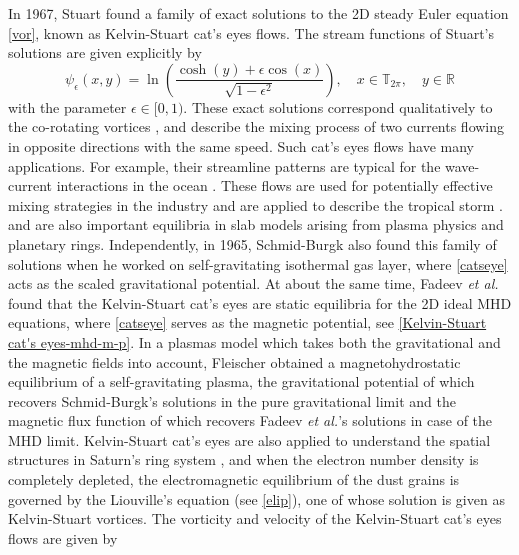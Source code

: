 \documentclass[1 [leqno, 11pt]{amsart}
\numberwithin{equation}{section}
\begin{document}
\begin{CJK*}{GBK}{song}
In 1967, Stuart \cite{stuart1967finite} found a family of exact solutions  to the 2D steady  Euler equation \eqref{vor}, known as Kelvin-Stuart cat's eyes flows. The stream functions of Stuart's solutions  are given explicitly by
\begin{equation}\label{catseye}
\psi_\epsilon(x,y) =  \ln \left(\frac{\cosh (y) + \epsilon \cos (x)}{\sqrt{1-\epsilon^2}} \right),\quad x\in\mathbb{T}_{2\pi},\quad y\in\mathbb{R}
\end{equation}
 with  the parameter $\epsilon \in [0, 1)$.
  These exact solutions correspond qualitatively to the co-rotating vortices \cite{Tabeling-Perrin-Fauve1987}, and
    describe the mixing process of two currents flowing in opposite directions with the same speed.
  Such cat's eyes flows have many applications. For example, their streamline patterns  are typical for the wave-current interactions in  the ocean \cite{Martin2018}.
  These flows are used for potentially effective mixing strategies in the industry \cite{Rossi-Doorly-Kustrin2013} and are applied to describe the tropical
storm \cite{Dunkerton-Montgomery-Wang2009}.
   and are also important equilibria in   slab models arising from plasma physics and  planetary rings.
  Independently, in 1965, Schmid-Burgk \cite{Schmid-Burgk1965} also found this family of solutions   when he worked on self-gravitating isothermal gas layer, where \eqref{catseye}  acts  as the scaled  gravitational potential.
  At about the same time,
 Fadeev  {\it et al.} \cite{Fadeev et al-1965} found that the Kelvin-Stuart cat's eyes are  static equilibria  for the 2D ideal MHD equations, where \eqref{catseye} serves as the  magnetic potential, see \eqref{Kelvin-Stuart cat's eyes-mhd-m-p}.
In a plasmas model which takes both the gravitational and the
magnetic fields into account,
  Fleischer \cite{Fleischer1998} obtained a magnetohydrostatic equilibrium of
a self-gravitating plasma, the gravitational potential of which recovers Schmid-Burgk's solutions in the pure gravitational limit and the magnetic flux function of which recovers Fadeev  {\it et al.}'s solutions
in
case of the MHD limit.
   Kelvin-Stuart cat's eyes are also  applied  to understand the
 spatial
structures  in Saturn's ring system \cite{Shukla-Sen1996}, and   when the electron number density
is completely depleted, the electromagnetic
equilibrium of the dust grains  is governed by
the Liouville's equation (see \eqref{elip}), one of whose solution is given as Kelvin-Stuart vortices.
\fi
 The vorticity and  velocity of the  Kelvin-Stuart cat's eyes flows are given by
 \begin{align} \label{steadyw}

\end{align}
\end{CJK*}
\end{document}
